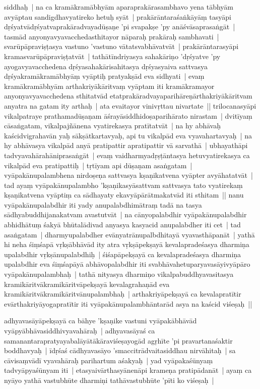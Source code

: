 \documentclass[article,12pt,a4paper]{memoir}
\newcommand{\persName}[1]{#1}
\begin{document}
siddhaḥ | na ca kramākramābhyām aparaprakārasambhavo yena tābhyām avyāptau sandigdhavyatireko hetuḥ syāt | prakārāntaraśaṅkāyāṃ tasyāpi dṛśyatvādṛśyatvaprakāradvayadūṣaṇe 'pi svapakṣe 'py anāśvāsaprasaṅgāt | tasmād anyonyavyavacchedasthitayor nāparaḥ prakāraḥ sambhavati | svarūpāpraviṣṭasya vastuno 'vastuno vātatsvabhāvatvāt | prakārāntarasyāpi kramasvarūpāpraviṣṭatvāt | tathātīndriyasya sahakāriṇo 'dṛśyatve 'py ayogavyavacchedena dṛśyasahakārisahitasya dṛśyasyaiva sattvasya dṛśyakramākramābhyāṃ vyāptiḥ pratyakṣād eva sidhyati | evaṃ kramākramābhyām arthakriyākāritvaṃ vyāptam iti kramākramayor anyonyavyavacchedena sthitatvād etatprakāradvayaparihāreṇārthakriyākāritvam anyatra na gatam ity arthaḥ | ata evaitayor vinivṛttau nivartate || \label{thakur75-91.17} \persName{trilocanasyā}pi vikalpatraye prathamadūṣaṇam āśrayāsiddhidoṣaparihārato nirastam | \label{thakur75-91.18} dvitīyaṃ cāsaṅgatam, vikalpajñānena vyatirekasya pratītatvāt | na hy abhāvaḥ kaścidvigrahavān yaḥ sākṣātkartavyaḥ, api tu vikalpād eva vyavahartavyaḥ | na hy abhāvasya vikalpād anyā pratipattir apratipattir vā sarvathā | ubhayathāpi tadvyavahārahāniprasaṅgāt | evaṃ vaidharmyadṛṣṭāntasya hetuvyatirekasya ca vikalpād eva pratipattiḥ | \label{thakur75-91.22} tṛtīyam api dūṣaṇam asaṅgatam | vyāpakānupalambhena nirdoṣeṇa sattvasya kṣaṇikatvena vyāpter avyāhatatvāt | \label{thakur75-91.23} tad ayaṃ vyāpakānupalambho 'kṣaṇikasyāsattvam sattvasya tato vyatirekaṃ kṣaṇikatvena vyāptiṃ ca sādhayaty ekavyāpārātmakatvād iti sthitam || \label{thakur75-91.25} nanu vyāpakānupalabdhir iti yady anupalabdhimātraṃ tadā na tasya sādhyabuddhijanakatvam avastutvāt | na cānyopalabdhir vyāpakānupalabdhir abhidhātuṃ śakyā bhūtalādivad anyasya kasyacid anupalabdher iti cet | \label{thakur75-91.27} tad asaṅgatam | dharmyupalabdher evānyatrānupalbdhitayā vyavasthāpanāt | yathā hi neha śiṃśapā vṛkṣābhāvād ity atra vṛkṣāpekṣayā kevalapradeśasya dharmiṇa upalabdhir vṛkṣānupalabdhiḥ | śiśapāpekṣayā ca kevalapradeśasya dharmiṇa upalabdhir eva śiṃśapāyā abhāvopalabdhir iti svabhāvahetuparyavasāyivyāpāro vyāpakānupalambhaḥ | tathā nityasya dharmiṇo vikalpabuddhyavasitasya kramikāritvākramikāritvāpekṣayā kevalagrahaṇād eva kramikāritvākramikāritvānupalambhaḥ | arthakriyāpekṣayā ca kevalapratītir evārthakriyāyogapratītir iti vyāpakānupalambhāntarād asya na kaścid viśeṣaḥ ||
	\pend
      

	  \pstart adhyavasāyāpekṣayā ca bāhye 'kṣaṇike vastuni vyāpakābhāvād vyāpyābhāvasiddhivyavahāraḥ | adhyavasāyaś ca samanantarapratyayabalāyātākāraviśeṣayogād agṛhīte 'pi pravartanaśaktir boddhavyaḥ | īdṛśaś cādhyavasāyo 'smaccitrādvaitasiddhau nirvāhitaḥ | sa cāvisaṃvādī vyavahāraḥ parihartum aśakyaḥ | yad vyāpakaśūnyaṃ tadvyāpyaśūnyam iti | etasyaivārthasyānenāpi krameṇa pratipādanāt | ayaṃ ca nyāyo yathā vastubhūte dharmiṇi tathāvastubhūte 'pīti ko viśeṣaḥ | 
	\pend
      
\end{document}
